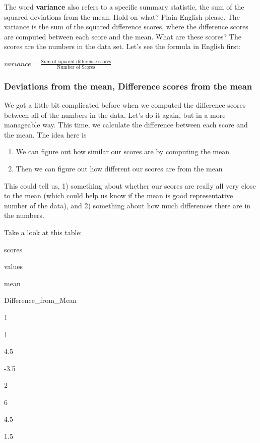 \documentclass[
]{book}
\providecommand{\tightlist}{%
  \setlength{\itemsep}{0pt}\setlength{\parskip}{0pt}}
\begin{document}
The word \textbf{variance} also refers to a specific summary statistic, the sum of the squared deviations from the mean. Hold on what? Plain English please. The variance is the sum of the squared difference scores, where the difference scores are computed between each score and the mean. What are these scores? The scores are the numbers in the data set. Let's see the formula in English first:

\(variance = \frac{\text{Sum of squared difference scores}}{\text{Number of Scores}}\)

\hypertarget{deviations-from-the-mean-difference-scores-from-the-mean}{%
\subsubsection{Deviations from the mean, Difference scores from the mean}\label{deviations-from-the-mean-difference-scores-from-the-mean}}

We got a little bit complicated before when we computed the difference scores between all of the numbers in the data. Let's do it again, but in a more manageable way. This time, we calculate the difference between each score and the mean. The idea here is

\begin{enumerate}
\def\labelenumi{\arabic{enumi}.}
\tightlist
\item
  We can figure out how similar our scores are by computing the mean
\item
  Then we can figure out how different our scores are from the mean
\end{enumerate}

This could tell us, 1) something about whether our scores are really all very close to the mean (which could help us know if the mean is good representative number of the data), and 2) something about how much differences there are in the numbers.

Take a look at this table:

scores

values

mean

Difference\_from\_Mean

1

1

4.5

-3.5

2

6

4.5

1.5
\end{document}
